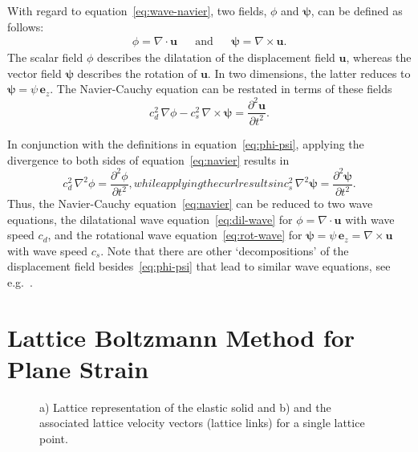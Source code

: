 \documentclass{article}
\renewcommand{\vec}{\boldsymbol}        %
\begin{document}
With regard to equation~\eqref{eq:wave-navier}, two fields, $\phi$ and $\vec{\psi}$, can be defined as follows:
\begin{align}
    \phi = \nabla \cdot \vec{u} &&\text{and} &&\vec{\psi} = \nabla \times \vec{u}. \label{eq:phi-psi}
\end{align}
The scalar field $\phi$ describes the dilatation of the displacement field $\vec{u}$, whereas the vector field $\vec{\psi}$ describes the rotation of $\vec{u}$. In two dimensions, the latter reduces to $\vec{\psi} = \psi \, \vec{e}_z$.
The Navier-Cauchy equation can be restated in terms of these fields
\begin{equation}
    c_d^2 \, \nabla \phi - c_s^2 \, \nabla \times \vec{\psi} = \frac{\partial^{2} \vec{u}}{\partial t^{2}}.   \label{eq:navier} 
\end{equation}

In conjunction with the definitions in equation~\eqref{eq:phi-psi}, applying the divergence to both sides of equation~\eqref{eq:navier} results in
\begin{subequations}
    \label{eq:wave-eqs}
    \begin{equation}
        c_d^2 \, \nabla^2 \phi = \frac{\partial^{2} \phi}{\partial t^{2}} \label{eq:dil-wave},
    \end{equation}
    while applying the curl results in 
    \begin{equation}
        c_s^2 \, \nabla^2 \vec{\psi} = \frac{\partial^{2} \vec{\psi}}{\partial t^{2}}.  \label{eq:rot-wave}
    \end{equation}
\end{subequations}
Thus, the Navier-Cauchy equation~\eqref{eq:navier} can be reduced to two wave equations, the dilatational wave equation~\eqref{eq:dil-wave} for ${ \phi = \nabla \cdot \vec{u} }$ with wave speed $c_d$, and the rotational wave equation~\eqref{eq:rot-wave} for ${ \vec{\psi} = \psi \, \vec{e}_z = \nabla \times \vec{u} }$ with wave speed $c_s$.
Note that there are other ‘decompositions' of the displacement field besides~\eqref{eq:phi-psi} that lead to similar wave equations, see e.g.~\cite{sternberg_integration_1960}.

\section{Lattice Boltzmann Method for Plane Strain}
\label{sec:planeStrainlbm}

\begin{figure}[bt]
    \centering
    \vspace{0.1cm}
    
    \caption{a) Lattice representation of the elastic solid and b)  and the associated lattice velocity vectors (lattice links) for a single lattice point.}
\label{fig:domain}
\end{figure}
\end{document}
